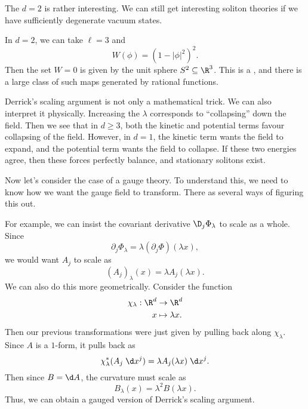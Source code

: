 \documentclass[a4paper]{article}
\begin{document}
The $d = 2$ is rather interesting. We can still get interesting soliton theories if we have sufficiently degenerate vacuum states.
\begin{eg}
  In $d = 2$, we can take $\ell = 3$ and
  \[
    W(\phi) = (1 - |\phi|^2)^2.
  \]
  Then the set $W = 0$ is given by the unit sphere $S^2 \subseteq \R^3$. This is a , and there is a large class of such maps generated by rational functions.
\end{eg}

Derrick's scaling argument is not only a mathematical trick. We can also interpret it physically. Increasing the $\lambda$ corresponds to ``collapsing'' down the field. Then we see that in $d \geq 3$, both the kinetic and potential terms favour collapsing of the field. However, in $d = 1$, the kinetic term wants the field to expand, and the potential term wants the field to collapse. If these two energies agree, then these forces perfectly balance, and stationary solitons exist.

Now let's consider the case of a gauge theory. To understand this, we need to know how we want the gauge field to transform. There as several ways of figuring this out.

For example, we can insist the covariant derivative $\D_j \Phi_\lambda$ to scale as a whole. Since
\[
  \partial_j \Phi_\lambda = \lambda (\partial_j \Phi)(\lambda x),
\]
we would want $A_j$ to scale as
\[
  (A_j)_\lambda(x) = \lambda A_j(\lambda x).
\]
We can also do this more geometrically. Consider the function
\begin{align*}
  \chi_\lambda: \R^d &\to \R^d\\
  x &\mapsto \lambda x.
\end{align*}
Then our previous transformations were just given by pulling back along $\chi_\lambda$. Since $A$ is a $1$-form, it pulls back as
\[
  \chi_\lambda^* (A_j \;\d x^j) = \lambda A_j (\lambda x) \;\d x^j.
\]
Then since $B = \d A$, the curvature must scale as
\[
  B_\lambda(x) = \lambda^2 B(\lambda x).
\]
Thus, we can obtain a gauged version of Derrick's scaling argument.
\end{document}
